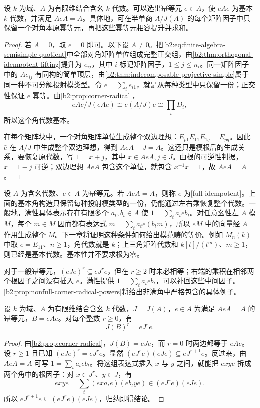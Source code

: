 \begin{proposition}\label{b2:prop:basic-corner}
	设 \(k\) 为域、\(A\) 为有限维结合含幺 \(k\) 代数。可以选出幂等元 \(e\in A\)，使 \(eAe\) 为基本 \(k\) 代数，并满足 \(AeA=A\)。具体地，可在半单商 \(A/J(A)\) 的每个矩阵因子中只保留一个对角本原幂等元，再把这些幂等元相容提升并求和。
\end{proposition}
\begin{proof}
	若 \(A=0\)，取 \(e=0\) 即可。以下设 \(A\ne0\)。把\eqref{b2:eq:finite-algebra-semisimple-quotient}中全部对角矩阵单位组成完整正交组，由\cref{b2:thm:orthogonal-idempotent-lifting}提升为 \(e_{ij}\)，其中 \(i\) 标记矩阵因子，\(1\le j\le n_i\)。同一矩阵因子中的 \(Ae_{ij}\) 有同构的简单顶层，由\cref{b2:thm:indecomposable-projective-simple}属于同一种不可分解投射模类型。令 \(e=\sum_i e_{i1}\)，就是从每种类型中只保留一份；正交性保证 \(e\) 幂等。由\cref{b2:prop:corner-radical}，
	\[
		eAe/J(eAe)\cong\bar e(A/J)\bar e\cong\prod_iD_i,
	\]
	所以这个角代数基本。

	在每个矩阵块中，一个对角矩阵单位生成整个双边理想：\(E_{p1}E_{11}E_{1q}=E_{pq}\)。因此 \(\bar e\) 在 \(A/J\) 中生成整个双边理想，得到 \(AeA+J=A\)。这还只是模根后的生成关系，要恢复原代数，写 \(1=x+j\)，其中 \(x\in AeA,j\in J\)。由根的可逆性判据，\(x=1-j\) 可逆；双边理想 \(AeA\) 包含这个单位，就包含 \(x^{-1}x=1\)，故 \(AeA=A\)。
\end{proof}

设 \(A\) 为含幺代数、\(e\in A\) 为幂等元。若 \(AeA=A\)，则称 \(e\) 为[full idempotent]。上面的基本角构造只保留每种投射模类型的一份，仍能通过左右乘恢复整个代数。一般地，满性具体表示存在有限多个 \(a_t,b_t\in A\) 使 \(1=\sum_ta_teb_t\)。对任意幺性左 \(A\) 模 \(M\)，每个 \(m\in M\) 因而都有表达式 \(m=\sum_ta_t e(b_tm)\)，所以 \(eM\) 中的向量经 \(A\) 作用生成整个 \(M\)。下一章将证明这种条件如何给出模范畴的等价。例如 \(M_n(k)\) 中取 \(e=E_{11}\)、\(n\ge1\)，角代数就是 \(k\)；上三角矩阵代数和 \(k[t]/(t^m)\)、\(m\ge1\)，则已经是基本代数。基本性并不要求根为零。

\ProseParagraphBreak
对于一般幂等元，\((eJe)^r\subseteq eJ^re\)，但在 \(r\ge2\) 时未必相等；右端的乘积在相邻两个根因子之间没有插入 \(e\)。满性提供 \(1=\sum_ta_teb_t\)，可以补回这些中间因子。\cref{b2:prop:nonfull-corner-radical-powers}将给出非满角中严格包含的具体例子。

\begin{proposition}\label{b2:prop:full-corner-radical-powers}
	设 \(k\) 为域、\(A\) 为有限维结合含幺 \(k\) 代数，\(J=J(A)\)，\(e\in A\) 为满足 \(AeA=A\) 的幂等元，\(B=eAe\)。对每个整数 \(r\ge0\)，有
	\[
		J(B)^r=eJ^re.
	\]
\end{proposition}
\begin{proof}
	由\cref{b2:prop:corner-radical}，\(J(B)=eJe\)，而 \(r=0\) 时两边都等于 \(eAe\)。设 \(r\ge1\) 且已知 \((eJe)^r=eJ^re\)。显然 \((eJ^re)(eJe)\subseteq eJ^{r+1}e\)。反过来，由 \(AeA=A\) 可写 \(1=\sum_t a_teb_t\)。将这组表达式插入 \(x\) 与 \(y\) 之间，就能把 \(exye\) 拆成两个角中的根因子：对 \(x\in J^r\)、\(y\in J\)，有
	\[
		exye=\sum_t(exa_te)(eb_tye)\in(eJ^re)(eJe).
	\]
	所以 \(eJ^{r+1}e\subseteq(eJ^re)(eJe)\)，归纳即得结论。
\end{proof}

